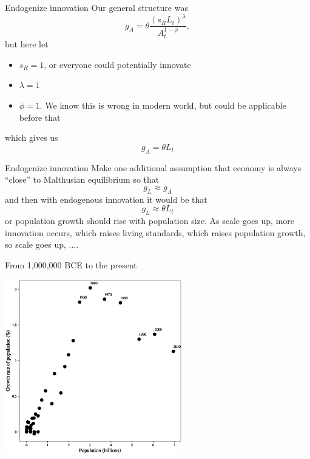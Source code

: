 \begin{frame}{Endogenize innovation}
Our general structure was
\begin{equation}
	g_A = \theta \frac{(s_R L_t)^{\lambda}}{A_t^{1-\phi}}, \label{EQ_ga_malthus}
\end{equation}
but here let
\begin{itemize}
	\item $s_R = 1$, or everyone could potentially innovate
	\item $\lambda = 1$
	\item $\phi = 1$. We know this is wrong in modern world, but could be applicable before that
\end{itemize}
which gives us
\begin{equation}
	g_A = \theta L_t
\end{equation}
\end{frame}

\begin{frame}{Endogenize innovation}
Make one additional assumption that economy is always ``close'' to Malthusian equilibrium so that
\begin{equation}
	g_L \approx g_A
\end{equation}
and then with endogenous innovation it would be that
\begin{equation}
	g_L \approx  \theta L_t
\end{equation}
or population growth should rise with population size. As scale goes up, more innovation occurs, which raises living standards, which raises population growth, so scale goes up, ....
\end{frame}

\begin{frame}{From 1,000,000 BCE to the present}
\begin{center}
\includegraphics[height=3in]{../Figures/fig-ch9-fig3.eps}
\end{center}
\end{frame}


